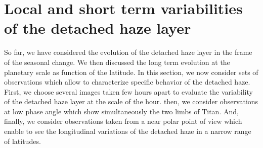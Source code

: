 \section{Local and short term variabilities of the detached haze layer}

So far, we have considered the evolution of the detached haze layer in the frame of the seasonal change.
We then discussed the long term evolution at the planetary scale as function of the latitude.
In this section, we now consider sets of observations which allow to characterize specific
behavior of the detached haze. First, we choose several images taken few hours apart to
evaluate the variability of the detached haze layer at the scale of the hour. then, we consider
observations at low phase angle which show simultaneously the two limbs of Titan. And, finally,
we consider observations taken from a near polar point of view which enable to see the
longitudinal variations of the detached haze in a narrow range of latitudes.



